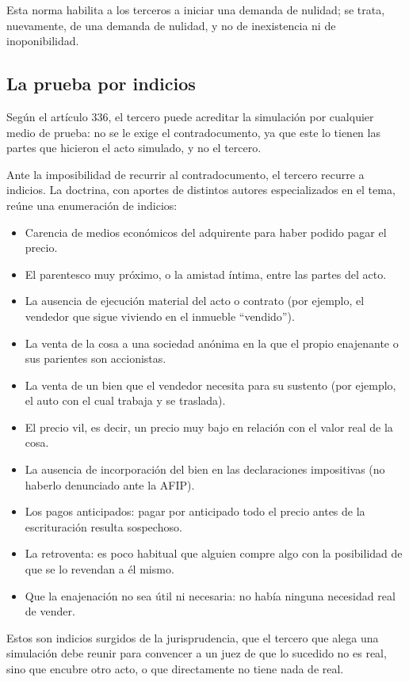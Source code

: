 \documentclass[12pt,oneside]{book}
\begin{document}
Esta norma habilita a los terceros a iniciar una demanda de nulidad; se trata, nuevamente, de una demanda de nulidad, y no de inexistencia ni de inoponibilidad.

\subsection{La prueba por indicios}

Según el artículo 336, el tercero puede acreditar la simulación por cualquier medio de prueba: no se le exige el contradocumento, ya que este lo tienen las partes que hicieron el acto simulado, y no el tercero.

Ante la imposibilidad de recurrir al contradocumento, el tercero recurre a indicios. La doctrina, con aportes de distintos autores especializados en el tema, reúne una enumeración de indicios:

\begin{itemize}
    \item Carencia de medios económicos del adquirente para haber podido pagar el precio.
    \item El parentesco muy próximo, o la amistad íntima, entre las partes del acto.
    \item La ausencia de ejecución material del acto o contrato (por ejemplo, el vendedor que sigue viviendo en el inmueble ``vendido'').
    \item La venta de la cosa a una sociedad anónima en la que el propio enajenante o sus parientes son accionistas.
    \item La venta de un bien que el vendedor necesita para su sustento (por ejemplo, el auto con el cual trabaja y se traslada).
    \item El precio vil, es decir, un precio muy bajo en relación con el valor real de la cosa.
    \item La ausencia de incorporación del bien en las declaraciones impositivas (no haberlo denunciado ante la AFIP).
    \item Los pagos anticipados: pagar por anticipado todo el precio antes de la escrituración resulta sospechoso.
    \item La retroventa: es poco habitual que alguien compre algo con la posibilidad de que se lo revendan a él mismo.
    \item Que la enajenación no sea útil ni necesaria: no había ninguna necesidad real de vender.
\end{itemize}

Estos son indicios surgidos de la jurisprudencia, que el tercero que alega una simulación debe reunir para convencer a un juez de que lo sucedido no es real, sino que encubre otro acto, o que directamente no tiene nada de real.
\end{document}
